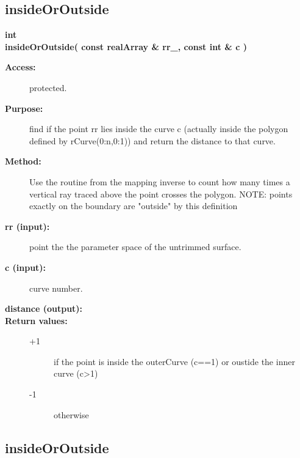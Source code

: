 \subsection{insideOrOutside}
 
\begin{flushleft} \textbf{%
int  \\ 
\settowidth{\TrimmedMappingIncludeArgIndent}{insideOrOutside(}%
insideOrOutside( const realArray \& rr\_, const int \& c )
}\end{flushleft}
\begin{description}
\item[{\bf Access:}]  protected.
\item[{\bf Purpose:}]  find if the point rr lies inside the curve c 
      (actually inside the polygon defined by rCurve(0:n,0:1)) and return
   the distance to that curve.
\item[{\bf Method:}] 
  Use the routine from the mapping inverse to count how many times a vertical ray traced
  above the point crosses the polygon. 
   NOTE: points exactly on the boundary are "outside" by this definition
\item[{\bf rr (input):}]  point the the parameter space of the untrimmed surface.
\item[{\bf c (input):}]  curve number.
\item[{\bf distance (output):}]  
\item[{\bf Return values:}] 
  \begin{description}
    \item[+1] if the point is inside the outerCurve (c==1) or oustide the inner curve (c>1)
    \item[-1] otherwise
  \end{description}   
\end{description}
\subsection{insideOrOutside}
 
